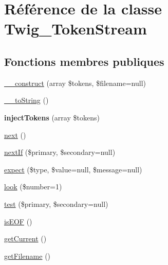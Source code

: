 \hypertarget{class_twig___token_stream}{}\section{Référence de la classe Twig\+\_\+\+Token\+Stream}
\label{class_twig___token_stream}
\subsection*{Fonctions membres publiques}
\begin{DoxyCompactItemize}
\item 
\hyperlink{class_twig___token_stream_a3a8bc69354b7ccd3ee2fc6d652946c0e}{\+\_\+\+\_\+construct} (array \$tokens, \$filename=null)
\item 
\hyperlink{class_twig___token_stream_a7516ca30af0db3cdbf9a7739b48ce91d}{\+\_\+\+\_\+to\+String} ()
\item 
{\bfseries inject\+Tokens} (array \$tokens)\hypertarget{class_twig___token_stream_a122abdaaaa2c432ded9e8d38dce57255}{}\label{class_twig___token_stream_a122abdaaaa2c432ded9e8d38dce57255}

\item 
\hyperlink{class_twig___token_stream_acea62048bfee7b3cd80ed446c86fb78a}{next} ()
\item 
\hyperlink{class_twig___token_stream_a98299de67ed3a15ecfadcbbaade22468}{next\+If} (\$primary, \$secondary=null)
\item 
\hyperlink{class_twig___token_stream_a0da4315fbdc3d46cf3665b4e8ae4bcf9}{expect} (\$type, \$value=null, \$message=null)
\item 
\hyperlink{class_twig___token_stream_a280a97f330083ec9d437c362e3406cf4}{look} (\$number=1)
\item 
\hyperlink{class_twig___token_stream_a9467b43d6c92b7033f09a94f9c7266d6}{test} (\$primary, \$secondary=null)
\item 
\hyperlink{class_twig___token_stream_afea23cbffd2f62df19df9b394f77dee5}{is\+E\+OF} ()
\item 
\hyperlink{class_twig___token_stream_ad926899d7cac34a3f1a90e552d8eb27d}{get\+Current} ()
\item 
\hyperlink{class_twig___token_stream_a2982abe8d7b767602a1485dfb4cf653d}{get\+Filename} ()
\end{DoxyCompactItemize}

